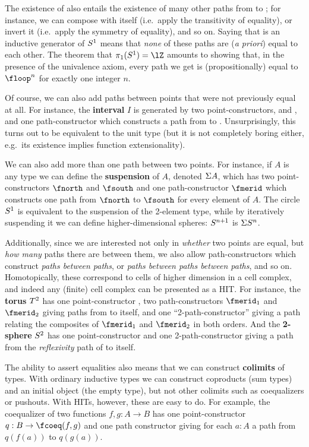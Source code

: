 \documentclass{amsart}
\begin{document}
The existence of \floop also entails the existence of many other paths from \fbase to \fbase; for instance, we can compose \floop with itself (i.e.\ apply the transitivity of equality), or invert it (i.e.\ apply the symmetry of equality), and so on.
Saying that \floop is an inductive generator of $S^1$ means that \emph{none} of these paths are (\textit{a priori}) equal to each other.
The theorem that $\pi_1(\circtype)=\lZ$ amounts to showing that, in the presence of the univalence axiom, every path we get is (propositionally) equal to $\floop^n$ for exactly one integer $n$.

Of course, we can also add paths between points that were not previously equal at all.
For instance, the \textbf{interval} $I$ is generated by two point-constructors, \fzero and \fone, and one path-constructor \fseg which constructs a path from \fzero to \fone.
Unsurprisingly, this turns out to be equivalent to the unit type (but it is not completely boring either, e.g.\ its existence implies function extensionality).

We can also add more than one path between two points.
For instance, if $A$ is any type we can define the \textbf{suspension} of $A$, denoted $\Sigma A$, which has two point-constructors $\fnorth$ and $\fsouth$ and one path-constructor $\fmerid$ which constructs one path from $\fnorth$ to $\fsouth$ for every element of $A$.
The circle $S^1$ is equivalent to the suspension of the 2-element type, while by iteratively suspending it we can define higher-dimensional spheres: $S^{n+1}$ is $\Sigma {\ensuremath{S^{n}}}$.

Additionally, since we are interested not only in \emph{whether} two points are equal, but \emph{how many} paths there are between them, we also allow path-constructors which construct \emph{paths between paths}, or \emph{paths between paths between paths}, and so on.
Homotopically, these correspond to cells of higher dimension in a cell complex, and indeed any (finite) cell complex can be presented as a HIT.
For instance, the \textbf{torus} $T^2$ has one point-constructor \fbase, two path-constructors $\fmerid_1$ and $\fmerid_2$ giving paths from \fbase to itself, and one ``2-path-constructor'' giving a path relating the composites of $\fmerid_1$ and $\fmerid_2$ in both orders.
And the \textbf{2-sphere} $S^{2}$ has one point-constructor \fbase and one 2-path-constructor \fsurf giving a path from the \emph{reflexivity} path of \fbase to itself.

The ability to assert equalities also means that we can construct \textbf{colimits} of types.
With ordinary inductive types we can construct coproducts (sum types) and an initial object (the empty type), but not other colimits such as coequalizers or pushouts.
With HITs, however, these are easy to do.
For example, the coequalizer of two functions $f,g:A\to B$ has one point-constructor $q:B\to \fcoeq(f,g)$ and one path constructor giving for each $a:A$ a path from $q(f(a))$ to $q(g(a))$.
\end{document}
